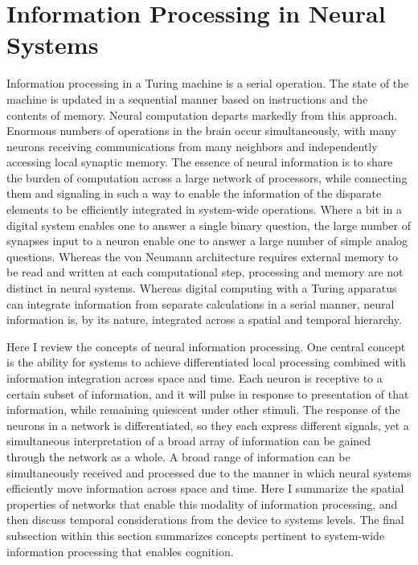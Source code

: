 \section{\label{sec:neuroscience}Information Processing in Neural Systems}
Information processing in a Turing machine is a serial operation. The state of the machine is updated in a sequential manner based on instructions and the contents of memory. Neural computation departs markedly from this approach. Enormous numbers of operations in the brain occur simultaneously, with many neurons receiving communications from many neighbors and independently accessing local synaptic memory. The essence of neural information is to share the burden of computation across a large network of processors, while connecting them and signaling in such a way to enable the information of the disparate elements to be efficiently integrated in system-wide operations. Where a bit in a digital system enables one to answer a single binary question, the large number of synapses input to a neuron enable one to answer a large number of simple analog questions. Whereas the von Neumann architecture requires external memory to be read and written at each computational step, processing and memory are not distinct in neural systems. Whereas digital computing with a Turing apparatus can integrate information from separate calculations in a serial manner, neural information is, by its nature, integrated across a spatial and temporal hierarchy.

Here I review the concepts of neural information processing. One central concept is the ability for systems to achieve differentiated local processing combined with information integration across space and time. Each neuron is receptive to a certain subset of information, and it will pulse in response to presentation of that information, while remaining quiescent under other stimuli. The response of the neurons in a network is differentiated, so they each express different signals, yet a simultaneous interpretation of a broad array of information can be gained through the network as a whole. A broad range of information can be simultaneously received and processed due to the manner in which neural systems efficiently move information across space and time. Here I summarize the spatial properties of networks that enable this modality of information processing, and then discuss temporal considerations from the device to systems levels. The final subsection within this section summarizes concepts pertinent to system-wide information processing that enables cognition.

